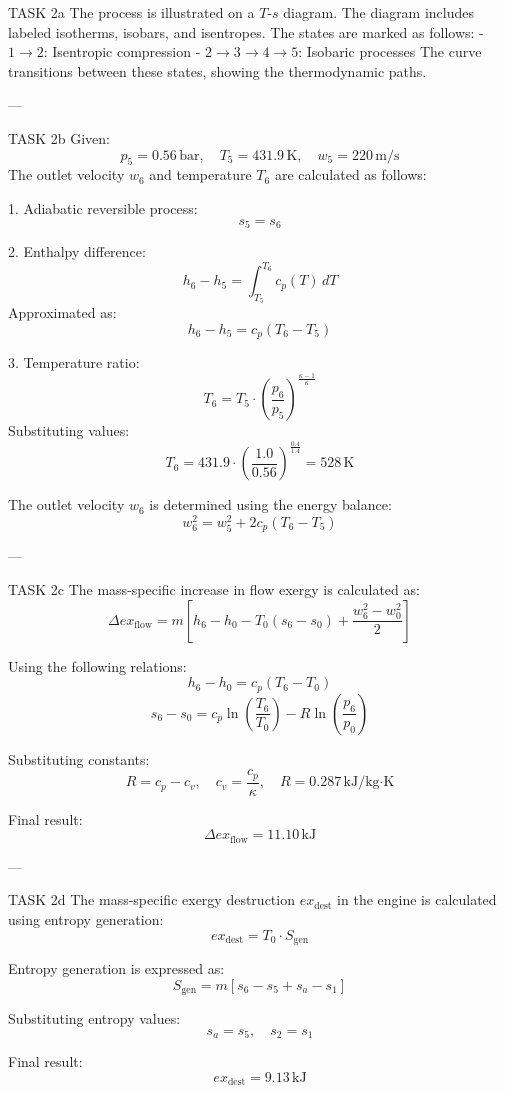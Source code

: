 TASK 2a  
The process is illustrated on a \( T \)-\( s \) diagram. The diagram includes labeled isotherms, isobars, and isentropes. The states are marked as follows:  
- \( 1 \to 2 \): Isentropic compression  
- \( 2 \to 3 \to 4 \to 5 \): Isobaric processes  
The curve transitions between these states, showing the thermodynamic paths.  

---

TASK 2b  
Given:  
\[
p_5 = 0.56 \, \text{bar}, \quad T_5 = 431.9 \, \text{K}, \quad w_5 = 220 \, \text{m/s}
\]  
The outlet velocity \( w_6 \) and temperature \( T_6 \) are calculated as follows:  

1. Adiabatic reversible process:  
\[
s_5 = s_6
\]  

2. Enthalpy difference:  
\[
h_6 - h_5 = \int_{T_5}^{T_6} c_p(T) \, dT
\]  
Approximated as:  
\[
h_6 - h_5 = c_p (T_6 - T_5)
\]  

3. Temperature ratio:  
\[
T_6 = T_5 \cdot \left( \frac{p_6}{p_5} \right)^{\frac{\kappa - 1}{\kappa}}
\]  
Substituting values:  
\[
T_6 = 431.9 \cdot \left( \frac{1.0}{0.56} \right)^{\frac{0.4}{1.4}} = 528 \, \text{K}
\]  

The outlet velocity \( w_6 \) is determined using the energy balance:  
\[
w_6^2 = w_5^2 + 2 c_p (T_6 - T_5)
\]  

---

TASK 2c  
The mass-specific increase in flow exergy is calculated as:  
\[
\Delta ex_{\text{flow}} = m \left[ h_6 - h_0 - T_0 (s_6 - s_0) + \frac{w_6^2 - w_0^2}{2} \right]
\]  

Using the following relations:  
\[
h_6 - h_0 = c_p (T_6 - T_0)
\]  
\[
s_6 - s_0 = c_p \ln \left( \frac{T_6}{T_0} \right) - R \ln \left( \frac{p_6}{p_0} \right)
\]  

Substituting constants:  
\[
R = c_p - c_v, \quad c_v = \frac{c_p}{\kappa}, \quad R = 0.287 \, \text{kJ/kg·K}
\]  

Final result:  
\[
\Delta ex_{\text{flow}} = 11.10 \, \text{kJ}
\]  

---

TASK 2d  
The mass-specific exergy destruction \( ex_{\text{dest}} \) in the engine is calculated using entropy generation:  
\[
ex_{\text{dest}} = T_0 \cdot S_{\text{gen}}
\]  

Entropy generation is expressed as:  
\[
S_{\text{gen}} = m \left[ s_6 - s_5 + s_a - s_1 \right]
\]  

Substituting entropy values:  
\[
s_a = s_5, \quad s_2 = s_1
\]  

Final result:  
\[
ex_{\text{dest}} = 9.13 \, \text{kJ}
\]  

